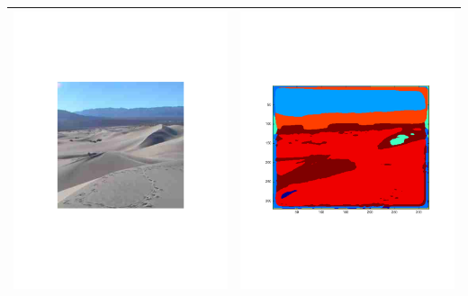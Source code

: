 \documentclass[12pt]{article}
\begin{document}
\begin{longtable}{| c | c |}
  \includegraphics[trim=40mm 40mm 40mm 40mm,clip=true,width=0.45\linewidth]{images/desert_1.pdf} & \includegraphics[trim=25mm 25mm 25mm 25mm,clip=true,width=0.45\linewidth]{images/desert_2.pdf} \\
  \hline

\end{longtable}
\end{document}
